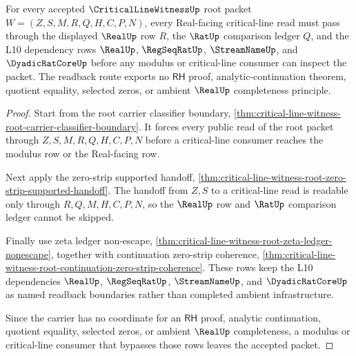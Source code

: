 \begin{theorem}
\label{thm:critical-line-witness-phase-real-readback-boundary}
For every accepted $\CriticalLineWitnessUp$ root packet $W=(Z,S,M,R,Q,H,C,P,N)$, every Real-facing critical-line read must pass through the displayed $\RealUp$ row $R$, the $\RatUp$ comparison ledger $Q$, and the L10 dependency rows $\RealUp$, $\RegSeqRatUp$, $\StreamNameUp$, and $\DyadicRatCoreUp$ before any modulus or critical-line consumer can inspect the packet. The readback route exports no $\mathsf{RH}$ proof, analytic-continuation theorem, quotient equality, selected zeros, or ambient $\RealUp$ completeness principle.
\end{theorem}
\begin{proof}
Start from the root carrier classifier boundary, \autoref{thm:critical-line-witness-root-carrier-classifier-boundary}. It forces every public read of the root packet through $Z,S,M,R,Q,H,C,P,N$ before a critical-line consumer reaches the modulus row or the Real-facing row.

Next apply the zero-strip supported handoff, \autoref{thm:critical-line-witness-root-zero-strip-supported-handoff}. The handoff from $Z,S$ to a critical-line read is readable only through $R,Q,M,H,C,P,N$, so the $\RealUp$ row and $\RatUp$ comparison ledger cannot be skipped.

Finally use zeta ledger non-escape, \autoref{thm:critical-line-witness-root-zeta-ledger-nonescape}, together with continuation zero-strip coherence, \autoref{thm:critical-line-witness-root-continuation-zero-strip-coherence}. These rows keep the L10 dependencies $\RealUp$, $\RegSeqRatUp$, $\StreamNameUp$, and $\DyadicRatCoreUp$ as named readback boundaries rather than completed ambient infrastructure.

Since the carrier has no coordinate for an $\mathsf{RH}$ proof, analytic continuation, quotient equality, selected zeros, or ambient $\RealUp$ completeness, a modulus or critical-line consumer that bypasses those rows leaves the accepted packet.
\end{proof}
